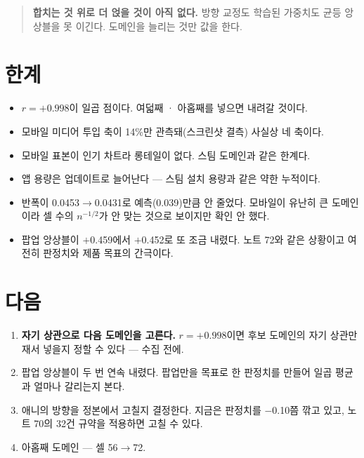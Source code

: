 \documentclass[10pt]{article}
\begin{document}
\begin{quote}\fontsize{9.5}{11.5}\selectfont
\textbf{합치는 것 위로 더 얹을 것이 아직 없다.} 방향 교정도 학습된 가중치도
균등 앙상블을 못 이긴다. 도메인을 늘리는 것만 값을 한다.
\end{quote}

\section{한계}

\begin{itemize}[leftmargin=1.1em,itemsep=0.15em]
\item $r=+0.998$이 일곱 점이다. 여덟째 · 아홉째를 넣으면 내려갈 것이다.
\item 모바일 미디어 투입 축이 14\%만 관측돼(스크린샷 결측) 사실상 네 축이다.
\item 모바일 표본이 인기 차트라 롱테일이 없다. 스팀 도메인과 같은 한계다.
\item 앱 용량은 업데이트로 늘어난다 --- 스팀 설치 용량과 같은 약한 누적이다.
\item 반폭이 0.0453$\to$0.0431로 예측(0.039)만큼 안 줄었다. 모바일이 유난히
      큰 도메인이라 셀 수의 $n^{-1/2}$가 안 맞는 것으로 보이지만 확인 안 했다.
\item 팝업 앙상블이 $+$0.459에서 $+$0.452로 또 조금 내렸다. 노트 72와 같은
      상황이고 여전히 판정치와 제품 목표의 간극이다.
\end{itemize}

\section{다음}

\begin{enumerate}[leftmargin=1.3em,itemsep=0.15em]
\item \textbf{자기 상관으로 다음 도메인을 고른다.} $r=+0.998$이면 후보 도메인의
      자기 상관만 재서 넣을지 정할 수 있다 --- 수집 전에.
\item 팝업 앙상블이 두 번 연속 내렸다. 팝업만을 목표로 한 판정치를 만들어
      일곱 평균과 얼마나 갈리는지 본다.
\item 애니의 방향을 정본에서 고칠지 결정한다. 지금은 판정치를 $-$0.10쯤
      깎고 있고, 노트 70의 32건 규약을 적용하면 고칠 수 있다.
\item 아홉째 도메인 --- 셀 56$\to$72.
\end{enumerate}
\end{document}

